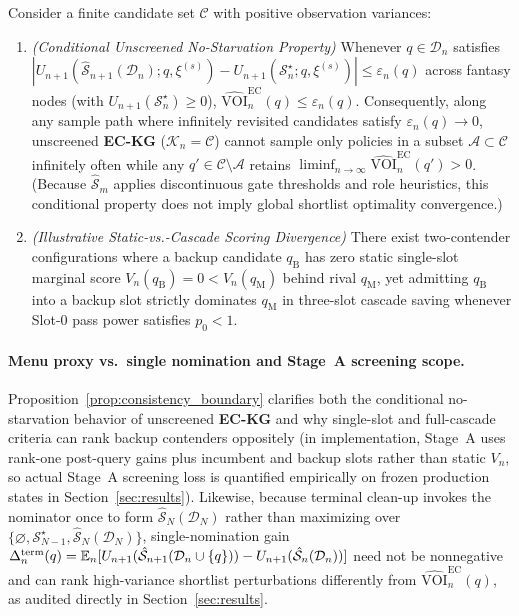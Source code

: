\begin{proposition}\label{prop:consistency_boundary}
Consider a finite candidate set $\mathcal{C}$ with positive observation variances:
\begin{enumerate}
  \item \emph{(Conditional Unscreened No-Starvation Property)} Whenever $q \in \mathcal{D}_n$ satisfies $|U_{n+1}(\hat{\mathcal{S}}_{n+1}(\mathcal{D}_n); q, \xi^{(s)}) - U_{n+1}(\mathcal{S}_n^\star; q, \xi^{(s)})| \le \varepsilon_n(q)$ across fantasy nodes (with $U_{n+1}(\mathcal{S}_n^\star) \ge 0$), $\widehat{\mathrm{VOI}}_n^{\mathrm{EC}}(q) \le \varepsilon_n(q)$. Consequently, along any sample path where infinitely revisited candidates satisfy $\varepsilon_n(q) \to 0$, unscreened \textbf{EC-KG} ($\mathcal{K}_n = \mathcal{C}$) cannot sample only policies in a subset $\mathcal{A} \subset \mathcal{C}$ infinitely often while any $q' \in \mathcal{C} \setminus \mathcal{A}$ retains $\liminf_{n \to \infty} \widehat{\mathrm{VOI}}_n^{\mathrm{EC}}(q') > 0$. (Because $\hat{\mathcal{S}}_m$ applies discontinuous gate thresholds and role heuristics, this conditional property does not imply global shortlist optimality convergence.)
  \item \emph{(Illustrative Static-vs.-Cascade Scoring Divergence)} There exist two-contender configurations where a backup candidate $q_{\mathrm{B}}$ has zero static single-slot marginal score $V_n(q_{\mathrm{B}}) = 0 < V_n(q_{\mathrm{M}})$ behind rival $q_{\mathrm{M}}$, yet admitting $q_{\mathrm{B}}$ into a backup slot strictly dominates $q_{\mathrm{M}}$ in three-slot cascade saving whenever Slot-0 pass power satisfies $p_0 < 1$.
\end{enumerate}
\end{proposition}

\paragraph{Menu proxy vs.\ single nomination and Stage~A screening scope.}
Proposition~\ref{prop:consistency_boundary} clarifies both the conditional no-starvation behavior of unscreened \textbf{EC-KG} and why single-slot and full-cascade criteria can rank backup contenders oppositely (in implementation, Stage~A uses rank-one post-query gains plus incumbent and backup slots rather than static $V_n$, so actual Stage~A screening loss is quantified empirically on frozen production states in Section~\ref{sec:results}). Likewise, because terminal clean-up invokes the nominator once to form $\hat{\mathcal{S}}_N(\mathcal{D}_N)$ rather than maximizing over $\{\varnothing, \mathcal{S}_{N-1}^\star, \hat{\mathcal{S}}_N(\mathcal{D}_N)\}$, single-nomination gain $\Delta_n^{\mathrm{term}}(q) = \mathbb{E}_n[U_{n+1}(\hat{\mathcal{S}}_{n+1}(\mathcal{D}_n \cup \{q\})) - U_{n+1}(\hat{\mathcal{S}}_n(\mathcal{D}_n))]$ need not be nonnegative and can rank high-variance shortlist perturbations differently from $\widehat{\mathrm{VOI}}_n^{\mathrm{EC}}(q)$, as audited directly in Section~\ref{sec:results}.

